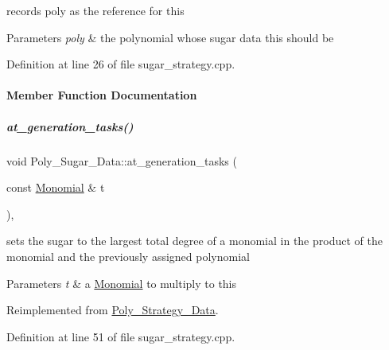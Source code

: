 records {\ttfamily poly} as the reference for {\ttfamily this} 


\begin{DoxyParams}{Parameters}
{\em poly} & the polynomial whose sugar data {\ttfamily this} should be \\
\hline
\end{DoxyParams}


Definition at line 26 of file sugar\+\_\+strategy.\+cpp.



\paragraph{Member Function Documentation}
\mbox{\label{group__strategygroup_a26a462d2dffa89942b82eeecf759bafa}} 
\subparagraph{\texorpdfstring{at\+\_\+generation\+\_\+tasks()}{at\_generation\_tasks()}}
{\footnotesize\ttfamily void Poly\+\_\+\+Sugar\+\_\+\+Data\+::at\+\_\+generation\+\_\+tasks (\begin{DoxyParamCaption}\item[{const \hyperlink{group__polygroup_class_monomial}{Monomial} \&}]{t }\end{DoxyParamCaption})\hspace{0.3cm}{\ttfamily [override]}, {\ttfamily [virtual]}}



sets the sugar to the largest total degree of a monomial in the product of the monomial and the previously assigned polynomial 


\begin{DoxyParams}{Parameters}
{\em t} & a \hyperlink{group__polygroup_class_monomial}{Monomial} to multiply to {\ttfamily this} \\
\hline
\end{DoxyParams}


Reimplemented from \hyperlink{group__strategygroup_a6683749a5fb30b6f91075a28899fbfe7}{Poly\+\_\+\+Strategy\+\_\+\+Data}.



Definition at line 51 of file sugar\+\_\+strategy.\+cpp.

